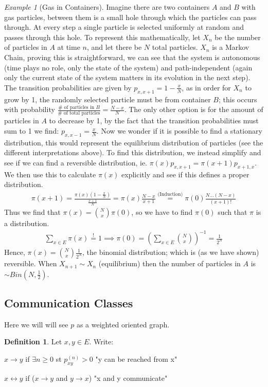 \documentclass[12pt]{book}
\theoremstyle{definition}
\newtheorem{defn}{Definition}[section]
\theoremstyle{remark}
\newtheorem{ex}{Example}[section]
\begin{document}
\begin{ex}[Gas in Containers]
	Imagine there are two containers $A$ and $B$ with gas particles, between them is a small hole through which the particles can pass through. At every step a single particle is selected uniformly at random and passes through this hole. To represent this mathematically, let $X_n$ be the number of particles in $A$ at time $n$, and let there be $N$ total particles. $X_n$ is a Markov Chain, proving this is straightforward, we can see that the system is autonomous (time plays no role, only the state of the system) and path-independent (again only the current state of the system matters in its evolution in the next step). The transition probabilities are given by $p_{x, x+1}= 1- \frac{x}{N}$, as in order for $X_n$ to grow by 1, the randomly selected particle must be from container $B $; this occurs with probability $\frac{\# \textrm{ of particles in }B}{\# \textrm{ of total particles}} = \frac{N-x}{N}$. The only other option is for the amount of particles in $A$ to decrease by 1, by the fact that the transition probabilities must sum to 1 we find: $p_{x, x-1}= \frac{x}{N}$. Now we wonder if it is possible to find a stationary distribution, this would represent the equilibrium distribution of particles (see the different interpretations above). To find this distribution, we instead simplify and see if we can find a reversible distribution, ie. $\pi (x) p_{x,x+1} = \pi (x+1)p_{x+1, x}$. We then use this to calculate $\pi (x)$ explicitly and see if this defines a proper distribution. 
	\begin{gather}
		\pi (x+1) = \frac{\pi (x)(1 - \frac{x}{N})}{\frac{x+1}{N}} = \pi (x) \frac{N-x}{x+1} \stackrel{\textrm{(Induction)}}{=} \pi (0) \frac{N ...(N-x)}{(x+1)!} 
	\end{gather}
Thus we find that $\pi (x) = \binom{N}{x}\pi(0)$, so we have to find $\pi (0)$ such that $\pi $ is a distribution. 
\begin{gather}
	\sum_{x \in E}^{} \pi (x) \stackrel{!}{=}1 \implies \pi (0) = \left( \sum_{x \in E}^{} \binom{N}{x} \right)^{-1} = \frac{1}{2^N} 
\end{gather}	
Hence, $\pi (x)= \binom{N}{x} \frac{1}{2^N}$, the binomial distribution; which is (as we have shown) reversible. When $X_{n+1} \sim X_n$ (equilibrium) then the number of particles in $A$ is $\sim Bin(N, \frac{1}{2})$.
\end{ex}


\subsection{Communication Classes}
Here we will will see $p$ as a weighted oriented graph.
\begin{defn}
	Let $x,y \in E$. Write:
\itemize
\item $x \to y$ if $\exists  n \geq 0$ st $p_{xy}^{(n)}> 0$ "y can be reached from x"
\item $x \leftrightarrow y$ if ($x \to y$ and  $y\to x $) "x and y communicate"
\end{defn}
\end{document}
